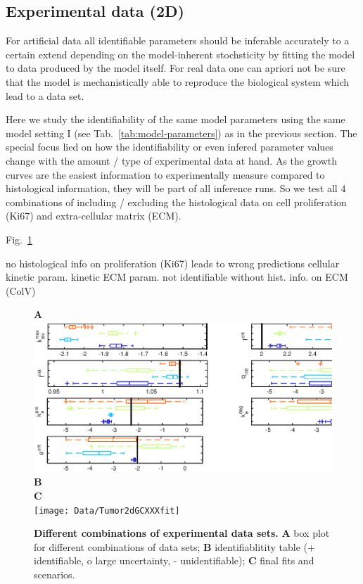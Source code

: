 \documentclass[10pt,letterpaper]{article}
\begin{document}
\subsection*{Experimental data (2D)} For artificial data all identifiable parameters should be inferable accurately to a certain extend depending on the model-inherent stochsticity by fitting the model to data produced by the model itself. For real data one can apriori not be sure that the model is mechanistically able to reproduce the biological system which lead to a data set. 

Here we study the identifiability of the same model parameters using the same model setting I (see Tab.~\ref{tab:model-parameters}) as in the previous section. The special focus lied on how the identifiability or even infered parameter values change with the amount / type of experimental data at hand. As the growth curves are the easiest information to experimentally measure compared to histological information, they will be part of all inference runs. So we test all 4 combinations of including / excluding the histological data on cell proliferation (Ki67) and extra-cellular matrix (ECM).

Fig.~\ref{fig:exp2d} 

no histological info on proliferation (Ki67) leads to wrong predictions cellular kinetic param.
kinetic ECM param. not identifiable without hist. info. on ECM (ColV)


\begin{figure}[htbp]
\textbf{A}\\
\includegraphics[width=\textwidth]{Data/Tumor2dGCXXXindependentBoxplots}\\
\textbf{B}\\


\textbf{C}\\
\texttt{[image: Data/Tumor2dGCXXXfit]}
\caption{{\bf Different combinations of experimental data sets.}
\textbf{A} box plot for different combinations of data sets; \textbf{B} identifiablitity table (+ identifiable, o large uncertainty, - unidentifiable); \textbf{C} final fits and scenarios.}
\label{fig:exp2d}
\end{figure}
\end{document}
